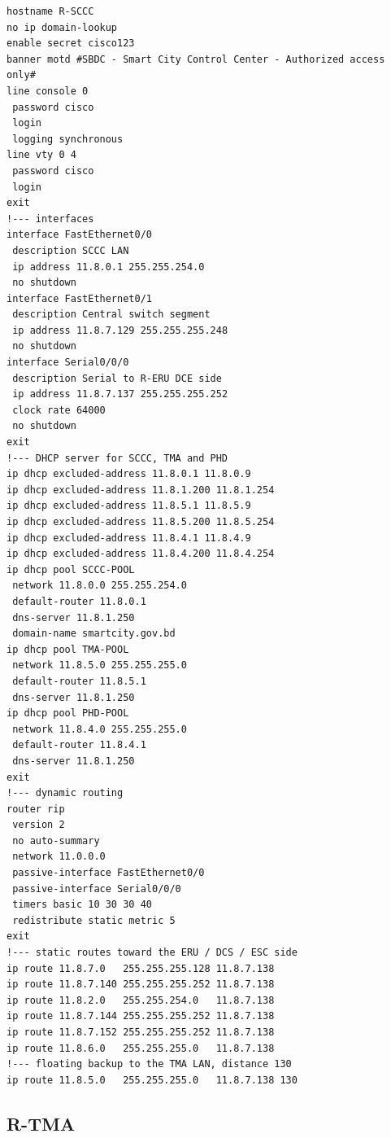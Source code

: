 \documentclass[11pt,a4paper]{article}
\begin{document}
\begin{lstlisting}
hostname R-SCCC
no ip domain-lookup
enable secret cisco123
banner motd #SBDC - Smart City Control Center - Authorized access only#
line console 0
 password cisco
 login
 logging synchronous
line vty 0 4
 password cisco
 login
exit
!--- interfaces
interface FastEthernet0/0
 description SCCC LAN
 ip address 11.8.0.1 255.255.254.0
 no shutdown
interface FastEthernet0/1
 description Central switch segment
 ip address 11.8.7.129 255.255.255.248
 no shutdown
interface Serial0/0/0
 description Serial to R-ERU DCE side
 ip address 11.8.7.137 255.255.255.252
 clock rate 64000
 no shutdown
exit
!--- DHCP server for SCCC, TMA and PHD
ip dhcp excluded-address 11.8.0.1 11.8.0.9
ip dhcp excluded-address 11.8.1.200 11.8.1.254
ip dhcp excluded-address 11.8.5.1 11.8.5.9
ip dhcp excluded-address 11.8.5.200 11.8.5.254
ip dhcp excluded-address 11.8.4.1 11.8.4.9
ip dhcp excluded-address 11.8.4.200 11.8.4.254
ip dhcp pool SCCC-POOL
 network 11.8.0.0 255.255.254.0
 default-router 11.8.0.1
 dns-server 11.8.1.250
 domain-name smartcity.gov.bd
ip dhcp pool TMA-POOL
 network 11.8.5.0 255.255.255.0
 default-router 11.8.5.1
 dns-server 11.8.1.250
ip dhcp pool PHD-POOL
 network 11.8.4.0 255.255.255.0
 default-router 11.8.4.1
 dns-server 11.8.1.250
exit
!--- dynamic routing
router rip
 version 2
 no auto-summary
 network 11.0.0.0
 passive-interface FastEthernet0/0
 passive-interface Serial0/0/0
 timers basic 10 30 30 40
 redistribute static metric 5
exit
!--- static routes toward the ERU / DCS / ESC side
ip route 11.8.7.0   255.255.255.128 11.8.7.138
ip route 11.8.7.140 255.255.255.252 11.8.7.138
ip route 11.8.2.0   255.255.254.0   11.8.7.138
ip route 11.8.7.144 255.255.255.252 11.8.7.138
ip route 11.8.7.152 255.255.255.252 11.8.7.138
ip route 11.8.6.0   255.255.255.0   11.8.7.138
!--- floating backup to the TMA LAN, distance 130
ip route 11.8.5.0   255.255.255.0   11.8.7.138 130
\end{lstlisting}

\subsection{R-TMA}
\end{document}
